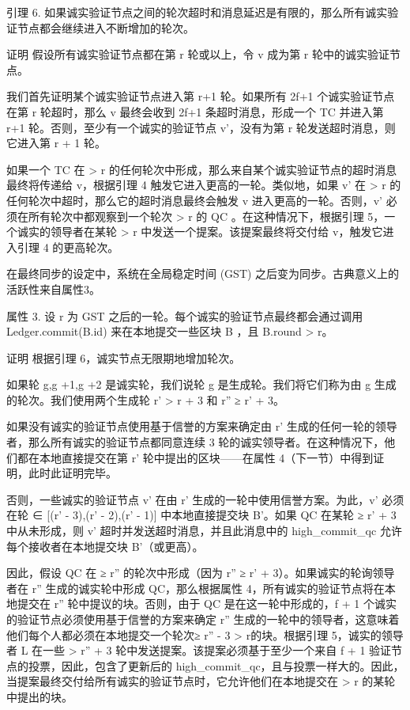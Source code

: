 引理 6. 如果诚实验证节点之间的轮次超时和消息延迟是有限的，那么所有诚实验证节点都会继续进入不断增加的轮次。

证明 假设所有诚实验证节点都在第 r 轮或以上，令 v 成为第 r 轮中的诚实验证节点。

我们首先证明某个诚实验证节点进入第 r+1 轮。如果所有 2f+1 个诚实验证节点在第 r 轮超时，那么 v 最终会收到 2f+1 条超时消息，形成一个 TC 并进入第 r+1 轮。否则，至少有一个诚实的验证节点 v'，没有为第 r 轮发送超时消息，则它进入第 r + 1 轮。

如果一个 TC 在 > r 的任何轮次中形成，那么来自某个诚实验证节点的超时消息最终将传递给 v，根据引理 4 触发它进入更高的一轮。类似地，如果 v' 在 > r 的任何轮次中超时，那么它的超时消息最终会触发 v 进入更高的一轮。否则，v' 必须在所有轮次中都观察到一个轮次 > r 的 QC 。在这种情况下，根据引理 5，一个诚实的领导者在某轮 > r 中发送一个提案。该提案最终将交付给 v，触发它进入引理 4 的更高轮次。

在最终同步的设定中，系统在全局稳定时间 (GST) 之后变为同步。古典意义上的活跃性来自属性3。

属性 3. 设 r 为 GST 之后的一轮。每个诚实的验证节点最终都会通过调用 Ledger.commit(B.id) 来在本地提交一些区块 B ，且 B.round > r。

证明 根据引理 6，诚实节点无限期地增加轮次。

如果轮 g,g +1,g +2 是诚实轮，我们说轮 g 是生成轮。我们将它们称为由 g 生成的轮次。我们使用两个生成轮 r' > r + 3 和 r'' ≥ r' + 3。

如果没有诚实的验证节点使用基于信誉的方案来确定由 r' 生成的任何一轮的领导者，那么所有诚实的验证节点都同意连续 3 轮的诚实领导者。在这种情况下，他们都在本地直接提交在第 r' 轮中提出的区块——在属性 4（下一节）中得到证明，此时此证明完毕。

否则，一些诚实的验证节点 v' 在由 r' 生成的一轮中使用信誉方案。为此，v' 必须在轮 ∈ [(r' - 3),(r' - 2),(r' - 1)] 中本地直接提交块 B'。如果 QC 在某轮 ≥ r' + 3 中从未形成，则 v' 超时并发送超时消息，并且此消息中的 high\_commit\_qc 允许每个接收者在本地提交块 B'（或更高）。

因此，假设 QC 在 ≥ r'' 的轮次中形成（因为 r'' ≥ r' + 3）。如果诚实的轮询领导者在 r'' 生成的诚实轮中形成 QC，那么根据属性 4，所有诚实的验证节点将在本地提交在 r'' 轮中提议的块。否则，由于 QC 是在这一轮中形成的，f + 1 个诚实的验证节点必须使用基于信誉的方案来确定 r'' 生成的一轮中的领导者，这意味着他们每个人都必须在本地提交一个轮次≥ r'' - 3 > r的块。根据引理 5，诚实的领导者 L 在一些 > r'' + 3 轮中发送提案。该提案必须基于至少一个来自 f + 1 验证节点的投票，因此，包含了更新后的 high\_commit\_qc，且与投票一样大的。因此，当提案最终交付给所有诚实的验证节点时，它允许他们在本地提交在 > r 的某轮中提出的块。

